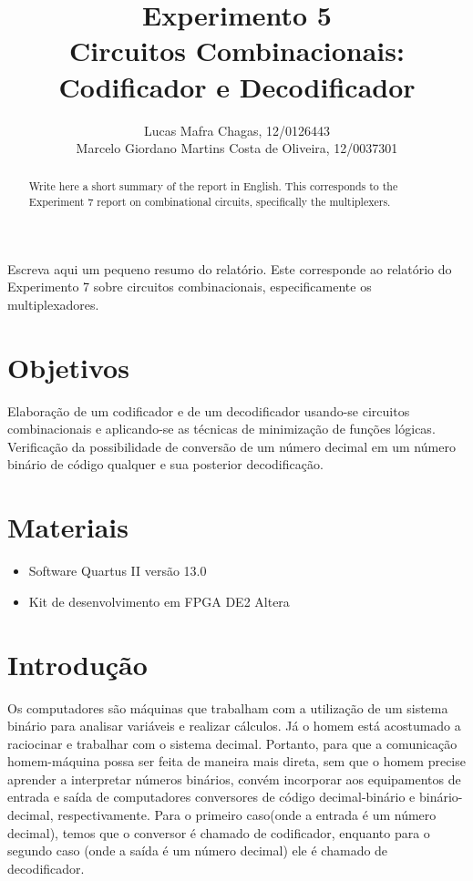\documentclass[12pt]{article}
\title{Experimento 5\\ 
	Circuitos Combinacionais: Codificador e Decodificador}
\author{
	Lucas Mafra Chagas, 12/0126443 \\
	Marcelo Giordano Martins Costa de Oliveira,  12/0037301
}
\begin{document}
 

\maketitle

 \begin{abstract}
   Write here a short summary of the report in English. This corresponds to the Experiment 7 report on combinational circuits, specifically the multiplexers.
 \end{abstract}
     
 \begin{resumo} 
  Escreva aqui um pequeno resumo do relatório. Este corresponde ao relatório do Experimento 7 sobre circuitos combinacionais, especificamente os multiplexadores.
 \end{resumo}


\section{Objetivos}
\label{sec:Objetivos}

Elaboração de um codificador e de um decodificador usando-se circuitos combinacionais e
aplicando-se as técnicas de minimização de funções lógicas. Verificação da possibilidade
de conversão de um número decimal em um número binário de código qualquer e sua
posterior decodificação.

\section{Materiais} 
\label{sec:Materiais}

\begin{itemize}
    \item Software Quartus II versão 13.0
	\item Kit de desenvolvimento em FPGA DE2 Altera
    
\end{itemize}


\section{Introdução}
\label{sec:Introducao}

Os computadores são máquinas que trabalham com a utilização de um sistema binário para analisar variáveis e realizar cálculos. Já o homem está acostumado a raciocinar e trabalhar com o sistema decimal. Portanto, para que a comunicação homem-máquina possa ser feita de maneira mais direta, sem que o homem precise aprender a interpretar números binários, convém incorporar aos equipamentos de entrada e saída de computadores conversores de código decimal-binário e binário-decimal, respectivamente. Para o primeiro caso(onde a entrada é um número decimal), temos que o conversor é chamado de codificador, enquanto para o segundo caso (onde a saída é um número decimal) ele é chamado de decodificador.
\end{document}

